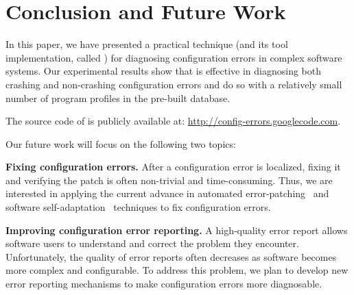\section{Conclusion and Future Work}

In this paper, we have presented a practical technique (and
its tool implementation, called \ourtool) for diagnosing
configuration errors in complex software systems.
Our experimental results show that \ourtool is effective in
diagnosing both crashing and non-crashing configuration errors
and do so with a relatively small number of program
profiles in the pre-built database.

The source code of \ourtool is publicly available at:
\url{http://config-errors.googlecode.com}.

\vspace{1mm}

Our future
work will focus on the following two topics:

\textbf{Fixing configuration errors.} After a configuration error
is localized, fixing it and verifying the patch is
often non-trivial and time-consuming. Thus, we
are interested in applying the current advance in
automated error-patching~\cite{rangefix} and
software self-adaptation~\cite{Wang:2009:STR, Mori:2011:LSU} techniques to
fix configuration errors.


\textbf{Improving configuration error reporting.} A high-quality
error report allows software users to understand and correct the problem
they encounter. 
Unfortunately, the quality of error reports often
decreases as software becomes more complex and configurable.
To address this problem, we plan to develop new error reporting mechanisms
to make configuration errors
more diagnosable.

